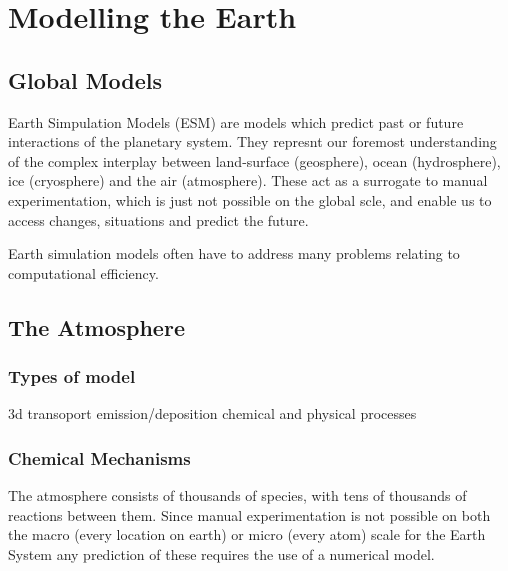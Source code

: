 \section{Modelling the Earth}

\subsection{Global Models}

 Earth Simpulation Models (ESM) are models which predict past or future interactions of the planetary system. They represnt our foremost understanding of the complex interplay between land-surface (geosphere), ocean (hydrosphere), ice (cryosphere) and the air (atmosphere). These act as a surrogate to manual experimentation, which is just not possible on the global scle, and enable us to access changes, situations and predict the future. 

Earth simulation models often have to address many problems relating to computational efficiency.  
% 
% 
% 
% 
% 
% 
% 


\subsection{The Atmosphere}

\subsubsection{Types of model}
3d transoport emission/deposition chemical and physical processes 




\subsubsection{Chemical Mechanisms}
The atmosphere consists of thousands of species, with tens of thousands of reactions between them. Since manual experimentation is not possible on both the macro (every location on earth) or micro (every atom) scale for the Earth System any prediction of these requires the use of a numerical model. 


